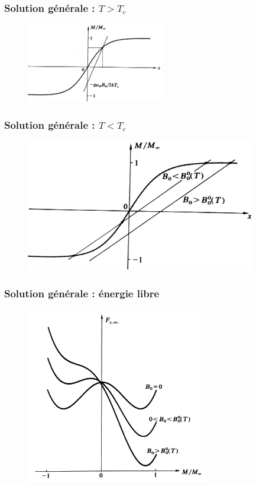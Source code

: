 \documentclass{beamer}
\begin{document}
\begin{frame}
\frametitle{Solution générale : $T>T_c$}
\begin{figure}
	\centerline{\includegraphics[width=6cm,angle=90]{Mx2}}
\end{figure}	
\end{frame}

\begin{frame}
\frametitle{Solution générale : $T<T_c$}
\begin{figure}
	\centerline{\includegraphics[width=10cm]{def_B0}}
\end{figure}
\end{frame}

\begin{frame}
\frametitle{Solution générale : énergie libre}
\begin{figure}
	\includegraphics[width=8cm]{F_cas_general}
\end{figure}
\end{frame}
\end{document}
